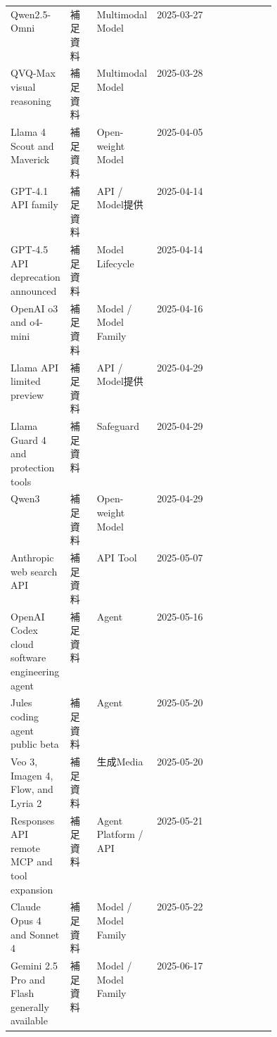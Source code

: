 \begin{center}
\begin{tabularx}{\linewidth}{@{}p{0.20\linewidth}p{0.10\linewidth}p{0.14\linewidth}X@{}}
Qwen2.5-Omni & 補足資料 & Multimodal Model & 2025-03-27   \\
QVQ-Max visual reasoning & 補足資料 & Multimodal Model & 2025-03-28   \\
Llama 4 Scout and Maverick & 補足資料 & Open-weight Model & 2025-04-05   \\
GPT-4.1 API family & 補足資料 & API / Model提供 & 2025-04-14   \\
GPT-4.5 API deprecation announced & 補足資料 & Model Lifecycle & 2025-04-14   \\
OpenAI o3 and o4-mini & 補足資料 & Model / Model Family & 2025-04-16   \\
Llama API limited preview & 補足資料 & API / Model提供 & 2025-04-29   \\
Llama Guard 4 and protection tools & 補足資料 & Safeguard & 2025-04-29   \\
Qwen3 & 補足資料 & Open-weight Model & 2025-04-29   \\
Anthropic web search API & 補足資料 & API Tool & 2025-05-07   \\
OpenAI Codex cloud software engineering agent & 補足資料 & Agent & 2025-05-16   \\
Jules coding agent public beta & 補足資料 & Agent & 2025-05-20   \\
Veo 3, Imagen 4, Flow, and Lyria 2 & 補足資料 & 生成Media & 2025-05-20   \\
Responses API remote MCP and tool expansion & 補足資料 & Agent Platform / API & 2025-05-21   \\
Claude Opus 4 and Sonnet 4 & 補足資料 & Model / Model Family & 2025-05-22   \\
Gemini 2.5 Pro and Flash generally available & 補足資料 & Model / Model Family & 2025-06-17   \\
\bottomrule
\end{tabularx}
\end{center}
\normalsize

